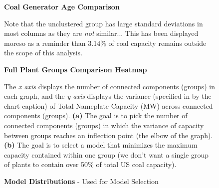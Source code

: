 \begin{figure}[htb]
    \centering
    
    
    \caption{\textbf{Coal Generator Age Comparison}}
    \medskip
    \footnotesize

    \smallskip  
    

    \label{fig:gen-ages}
\end{figure}

\begin{figure}[htb]
    \centering
      
    \caption{\textbf{Full Plant Groups Comparison Heatmap}}
    \medskip
    \footnotesize

    \smallskip  
    
    Note that the unclustered group has large standard deviations in most columns as they are \textit{not} similar... This has been displayed moreso as a reminder than 3.14\% of coal 
    capacity remains outside the scope of this analysis.

    \label{fig:heatmap-SIs}
\end{figure}

\begin{figure}[htb]
    \centering

    \begin{minipage}{0.95\textwidth}
        
    \end{minipage}

    \medskip

    \begin{minipage}{0.95\textwidth}
        
    \end{minipage}%
    
    \caption{\textbf{Model Distributions} - Used for Model Selection}
    \medskip
    \footnotesize

    \smallskip  
    
    The \textit{x axis} displays the number of connected components (groups) in each graph, and the \textit{y axis} displays the variance (specified in by the chart caption) of Total Nameplate Capacity (MW) across connected components (groups).
    \textbf{(a)} The goal is to pick the number of connected components (groups) in which the variance of capacity between groups reaches an inflection point (the elbow of the graph).
    \textbf{(b)} The goal is to select a model that minimizes the maximum capacity contained within one group (we don't want a single group of plants to contain over 50\% of total US coal capacity).

    \label{fig:run-measures}
\end{figure}



